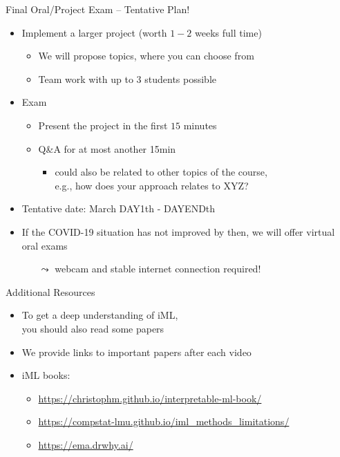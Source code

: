 \documentclass[aspectratio=169]{../latex_main/tntbeamer}  %
\begin{document}
\begin{frame}[c]{Final Oral/Project Exam -- Tentative Plan!}

\begin{itemize}
  \item Implement a larger project (worth $1-2$ weeks full time)
  \begin{itemize}
 		\item We will propose topics, where you can choose from
 		\item Team work with up to $3$ students possible
  \end{itemize}
  \pause
  \item Exam
	\begin{itemize}
		\item Present the project in the first $15$ minutes
		\item Q\&A for at most another 15min
		    \begin{itemize}
		        \item could also be related to other topics of the course, \\
		        e.g., how does your approach relates to XYZ?
		    \end{itemize}
	\end{itemize}	
  \item Tentative date: March DAY1th - DAYENDth
  \pause
  \item If the COVID-19 situation has not improved by then, we will offer virtual oral exams 
  \begin{itemize}
      \item[$\leadsto$] webcam and stable internet connection required!
  \end{itemize}
\end{itemize}

\end{frame}
\begin{frame}[c]{Additional Resources}

\begin{itemize}
  \item To get a deep understanding of iML,\\ you should also read some papers 
  \item We provide links to important papers after each video
  \item iML books: 
  \begin{itemize}
      \item \url{https://christophm.github.io/interpretable-ml-book/}
      \item \url{https://compstat-lmu.github.io/iml_methods_limitations/}
      \item \url{https://ema.drwhy.ai/}
  \end{itemize}
\end{itemize}

\end{frame}
\end{document}
